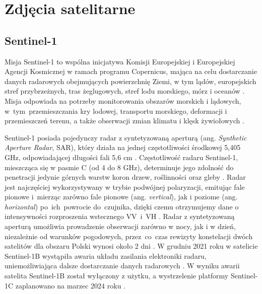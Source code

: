 \documentclass{amuthesis}
\begin{document}
\hypertarget{sec-satellite-imagery}{%
\section{Zdjęcia satelitarne}\label{sec-satellite-imagery}}

\hypertarget{sec-sentinel1}{%
\subsection{Sentinel-1}\label{sec-sentinel1}}

Misja Sentinel-1 to wspólna inicjatywa Komisji Europejskiej i
Europejskiej Agencji Kosmicznej w ramach programu Copernicus, mająca na
celu dostarczanie danych radarowych obejmujących powierzchnię Ziemi, w
tym lądów, europejskich stref przybrzeżnych, tras żeglugowych, stref
lodu morskiego, mórz i oceanów
\autocite{hejmanowska_2020_dane,sentinel1_mission_objectives}. Misja
odpowiada na potrzeby monitorowania obszarów morskich i lądowych,
w~tym~przemieszczania kry lodowej, transportu morskiego, deformacji i
przemieszczeń terenu, a także obserwacji zmian klimatu i klęsk
żywiołowych
\autocite{hejmanowska_2020_dane,sentinel1_mission_objectives}.

Sentinel-1 posiada pojedynczy radar z syntetyzowaną aperturą (ang.
\emph{Synthetic Aperture Radar}, SAR), który działa na jednej
częstotliwości środkowej 5,405 GHz, odpowiadającej długości fali 5,6 cm
\autocite{sentinel1_lulc,sentinel1_instrument_payload}. Częstotliwość
radaru Sentinel-1, mieszcząca się w pasmie C (od 4 do 8 GHz),
determinuje jego zdolność do penetracji jedynie górnych warstw koron
drzew, roślinności oraz gleby \autocite{sentinel_1_user_guide}. Radar
jest najczęściej wykorzystywany w trybie podwójnej polaryzacji, emitując
fale pionowe i~mierząc zarówno fale pionowe (ang. \emph{vertical}), jak
i poziome (ang. \emph{horizontal}) po~ich~powrocie do~czujnika, dzięki
czemu otrzymujemy dane o intensywności rozproszenia wstecznego VV~i~VH
\autocite{sentinel1_lulc}. Radar z syntetyzowaną aperturą umożliwia
prowadzenie obserwacji zarówno w nocy, jak i w dzień, niezależnie od
warunków pogodowych, przez~co~czas rewizyty konstelacji dwóch satelitów
dla obszaru Polski wynosi około 2 dni
\autocite{attema_2008_s1,sentinel1_revisit}. W grudniu 2021 roku w
satelicie Sentinel-1B wystąpiła awaria układu zasilania elektroniki
radaru, uniemożliwiająca dalsze dostarczanie danych radarowych
\autocite{sentinel_1b}. W wyniku awarii satelita Sentinel-1B został
wyłączony z użytku, a wystrzelenie platformy Sentinel-1C zaplanowano na
marzec 2024 roku \autocite{sentinel_1b,sentinel1_eoportal}.
\end{document}
